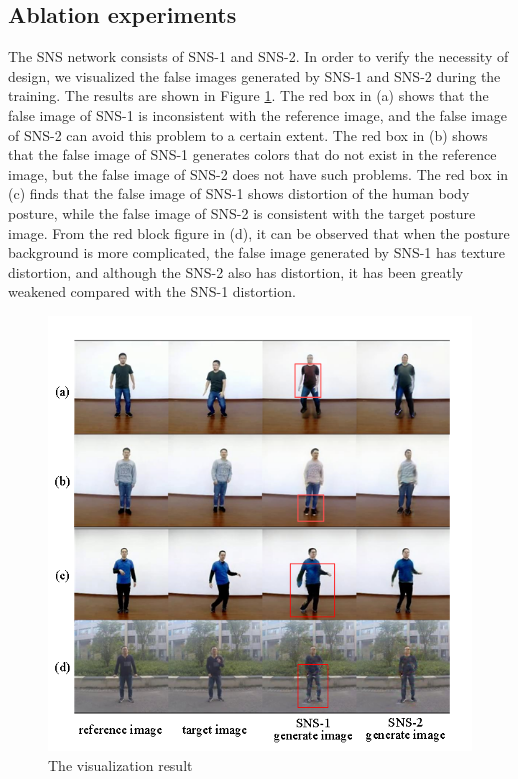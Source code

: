 \subsection{Ablation experiments}
	
The SNS network consists of SNS-1 and SNS-2. In order to verify the necessity of design, we visualized the false images generated by SNS-1 and SNS-2 during the training. The results are shown in Figure \ref{image07}. The red box in (a) shows that the false image of SNS-1 is inconsistent with the reference image, and the false image of SNS-2 can avoid this problem to a certain extent. The red box in (b) shows that the false image of SNS-1 generates colors that do not exist in the reference image, but the false image of SNS-2 does not have such problems. The red box in (c) finds that the false image of SNS-1 shows distortion of the human body posture, while the false image of SNS-2 is consistent with the target posture image. From the red block figure in (d), it can be observed that when the posture background is more complicated, the false image generated by SNS-1 has texture distortion, and although the SNS-2 also has distortion, it has been greatly weakened compared with the SNS-1 distortion.
	
	\begin{figure}
		\centering
		\includegraphics[scale=1]{image07.png}
		\caption{The visualization result}
		\label{image07}
	\end{figure}

